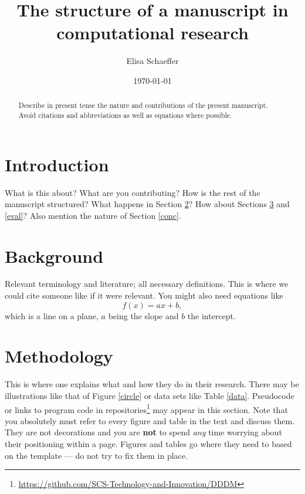 \documentclass{article}
\begin{document}
\author{Elisa Schaeffer}
\date{\today}
\title{The structure of a manuscript in computational research}

\maketitle

\begin{abstract}
  Describe in present tense the nature and contributions of the
  present manuscript. Avoid citations and abbreviations as well as
  equations where possible.
\end{abstract}


\section{Introduction}
\label{int}

What is this about? What are you contributing? How is the rest of the
manuscript structured? What happens in Section \ref{bg}? How about
Sections \ref{met} and \ref{eval}? Also mention the nature of Section
\ref{conc}.

\section{Background}
\label{bg}

Relevant terminology and literature; all necessary definitions.  This
is where we could cite someone like \citet{elisa} if it were
relevant. You might also need equations like
\begin{equation}
  f(x) = a x + b,
\end{equation}
which is a line on a plane, $a$ being the slope and $b$ the intercept.

\section{Methodology}
\label{met}

This is where one explains what and how they do in their
research. There may be illustrations like that of Figure \ref{circle}
or data sets like Table \ref{data}. Pseudocode or links to program
code in
repositories\footnote{\url{https://github.com/SCS-Technology-and-Innovation/DDDM}}
may appear in this section. Note that you absolutely must refer to
every figure and table in the text and discuss them. They are not
decorations and you are {\bf not} to spend {\em any} time worrying
about their positioning within a page. Figures and tables go where they need to based on the template --- do not try to fix them in place.
\end{document}
